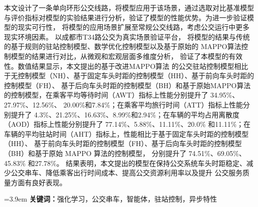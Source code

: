 本文设计了一条单向环形公交线路，将模型应用于该场景，通过选取对比基准模型
与评价指标对模型的实验结果进行分析，验证了模型的性能优势。为进一步验证模型的现实可行性，
将模型的应用场景扩展至常规公交线路，考虑公交运行中更多现实环境因素。
以成都市T34路公交为真实场景验证平台，
将模型的结果与传统的基于规则的驻站控制模型、数学优化控制模型以及基于原始的
MAPPO算法控制模型的结果进行对比，从微观和宏观层面多维度分析，
验证了本模型的有效性。数值结果显示，本文提出的基于改进MAPPO算法
的公交驻站控制模型相比于无控制模型（NH）、基于固定车头时距的控制模型（HH）、基于前向车头时距的控制模型（FH）、
基于后向车头时距的控制模型（BH）和基于原始MAPPO算法的控制模型，在乘客平均等待时间（AWT）指标上性能分别提升了 34.95\%、27.97\%、12.56\%、
20.00\%和7.84\%；在乘客平均旅行时间（ATT）指标上性能分别提升了
4.3\%、21.25\%、16.63\%、8.99\%和2.94\%；在车辆的平均占用离散度（AOD）指标上性能分别提升了 77.14\%、5.88\%、11.11\%、20.0\%
和11.11\%；在车辆的平均驻站时间（AHT）指标上，性能相比于基于固定车头时距的控制模型（HH）、
基于前向车头时距的控制模型（FH）、基于后向车头时距的控制模型（BH）和基于原始 MAPPO 算法的控制模型，
分别提升了 74.51\%、69.05\%、45.83\% 和27.78\%。
结果表明，本文提出的模型在保持公交系统车头时距稳定、减少公交串车、降低乘客出行时间成本、提高公交资源利用率以及提升
公交服务质量方面有良好表现。

\vspace{1em}

\noindent \hangindent=3.9em \textbf{关键词：}强化学习，公交串车，智能体，驻站控制，异步特性